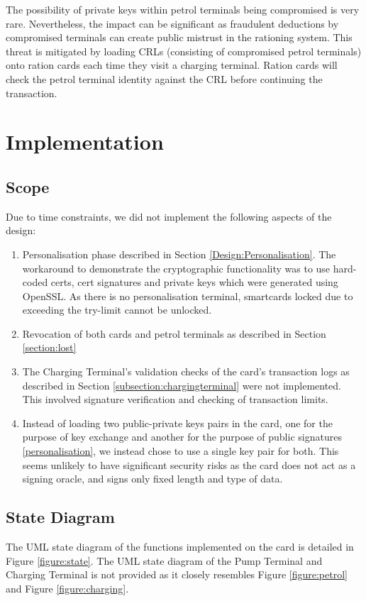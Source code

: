 \documentclass[a4paper,10pt]{llncs}
\begin{document}
The possibility of private keys within petrol terminals being compromised is very rare. Nevertheless, the impact can be significant as fraudulent deductions by compromised terminals can create public mistrust in the rationing system. This threat is mitigated by loading CRLs (consisting of compromised petrol terminals) onto ration cards each time they visit a charging terminal. Ration cards will check the petrol terminal identity against the CRL before continuing the transaction.

\section{Implementation}

\subsection{Scope}
Due to time constraints, we did not implement the following aspects of the design:
\label{chapter:limitations}
\begin{enumerate}
 \item Personalisation phase described in Section \ref{Design:Personalisation}. The workaround to demonstrate the cryptographic functionality was to use hard-coded certs, cert signatures and private keys which were generated using OpenSSL. As there is no personalisation terminal, smartcards locked due to exceeding the try-limit cannot be unlocked.
  \item Revocation of both cards and petrol terminals as described in Section \ref{section:lost}
  \item The Charging Terminal's validation checks of the card's transaction logs as described in Section \ref{subsection:chargingterminal} were not implemented. This involved signature verification and checking of transaction limits.
  \item Instead of loading two public-private keys pairs in the card, one for the purpose of key exchange and another for the purpose of public signatures \ref{personalisation}, we instead chose to use a single key pair for both. This seems unlikely to have significant security risks as the card does not act as a signing oracle, and signs only fixed length and type of data.
\end{enumerate}

\subsection{State Diagram}
The UML state diagram of the functions implemented on the card is detailed in Figure \ref{figure:state}. The UML state diagram of the Pump Terminal and Charging Terminal is not provided as it closely resembles Figure \ref{figure:petrol} and Figure \ref{figure:charging}.
\end{document}
